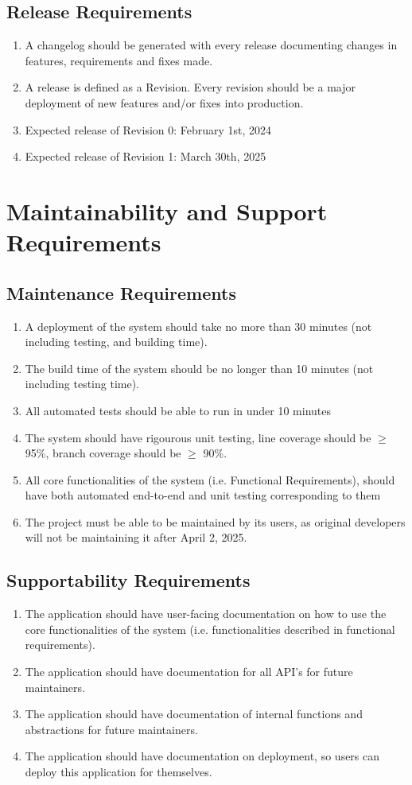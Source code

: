 \documentclass[12pt]{article}
\begin{document}
\subsection{Release Requirements}
\begin{enumerate} [{OE-REL}1.]
  \item A changelog should be generated with every release documenting changes in features, requirements and fixes made.
  \item A release is defined as a Revision. Every revision should be a major deployment of new features and/or fixes into production.
  \item Expected release of Revision 0: February 1st, 2024
  \item Expected release of Revision 1: March 30th, 2025
\end{enumerate}

\section{Maintainability and Support Requirements}
\subsection{Maintenance Requirements}
\begin{enumerate} [{MS-MTN}1.]
  \item A deployment of the system should take no more than 30 minutes (not
  including testing, and building time).
  \item The build time of the system should be no longer than 10 minutes (not
  including testing time).
  \item All automated tests should be able to run in under 10 minutes
  \item The system should have rigourous unit testing, line coverage should be
  $\ge$ 95\%, branch coverage should be $\ge$ 90\%.
  \item All core functionalities of the system (i.e. Functional Requirements),
  should have both automated end-to-end and unit testing corresponding to them
  \item The project must be able to be maintained by its users, as original
  developers will not be maintaining it after April 2, 2025.
\end{enumerate}
\subsection{Supportability Requirements}
\begin{enumerate} [{MS-SUP}1.]
  \item The application should have user-facing documentation on how to use the
  core functionalities of the system (i.e. functionalities described in
  functional requirements).
  \item The application should have documentation for all API's for future
  maintainers.
  \item The application should have documentation of internal functions and 
  abstractions for future maintainers.
  \item The application should have documentation on deployment, so users can
  deploy this application for themselves.
\end{enumerate}
\end{document}
